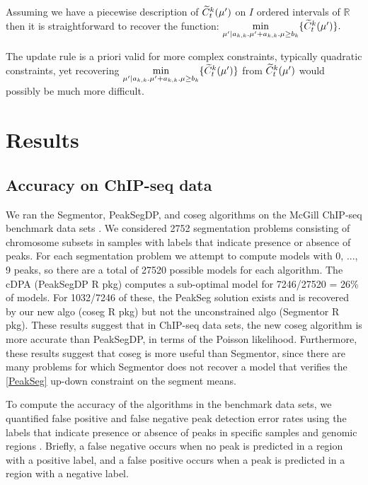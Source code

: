 \documentclass{article}
\begin{document}
Assuming we have a piecewise description of $\widetilde{C}^{k}_{t}(\mu')$ on $I$ ordered intervals of $\mathbb{R}$
then it is straightforward to recover the function:
$\underset{\mu' | a_{k,k}. \mu' + a_{k,k}. \mu  \geq  b_{k}}{\min} \{ \widetilde{C}^{k}_{t}(\mu') \}.$

The update rule is a priori valid for more complex constraints, typically quadratic constraints, yet recovering
$\underset{\mu' | a_{k,k}. \mu' + a_{k,k}. \mu  \geq  b_{k}}{\min} \{ \widetilde{C}^{k}_{t}(\mu') \}$ from $\widetilde{C}^{k}_{t}(\mu')$ would possibly be much more difficult.


\section{Results}

\subsection{Accuracy on ChIP-seq data}

We ran the Segmentor, PeakSegDP, and coseg algorithms on the McGill
ChIP-seq benchmark data sets \citep{HOCKING2016-chipseq}. We
considered 2752 segmentation problems consisting of chromosome subsets
in samples with labels that indicate presence or absence of peaks. For
each segmentation problem we attempt to compute models with 0, ..., 9
peaks, so there are a total of 27520 possible models for each
algorithm. The cDPA (PeakSegDP R pkg) computes a sub-optimal model for
7246/27520 = 26\% of models. For 1032/7246 of these, the PeakSeg
solution exists and is recovered by our new algo (coseg R pkg) but not
the unconstrained algo (Segmentor R pkg). These results suggest that
in ChIP-seq data sets, the new coseg algorithm is more accurate than
PeakSegDP, in terms of the Poisson likelihood. Furthermore, these
results suggest that coseg is more useful than Segmentor, since there
are many problems for which Segmentor does not recover a model that
verifies the \ref{PeakSeg} up-down constraint on the segment means.

To compute the accuracy of the algorithms in the benchmark data sets,
we quantified false positive and false negative peak detection error
rates using the labels that indicate presence or absence of peaks in
specific samples and genomic regions
\citep{HOCKING2016-chipseq}. Briefly, a false negative occurs when no
peak is predicted in a region with a positive label, and a false
positive occurs when a peak is predicted in a region with a negative
label.
\end{document}
